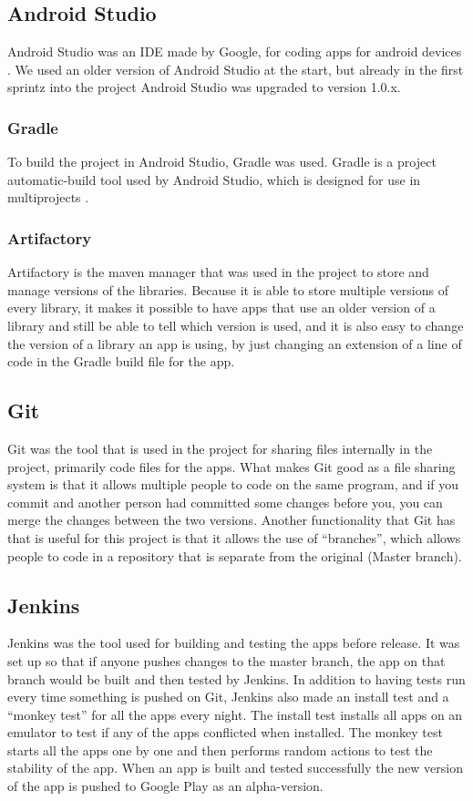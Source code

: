 \subsection{Android Studio}
 Android Studio was an IDE made by Google, for coding apps for android devices \citep{AndroidStudio}. We used an older version of Android Studio at the start, but already in the first sprintz into the project Android Studio was upgraded to version 1.0.x.

\subsubsection{Gradle}
To build the project in Android Studio, Gradle was used. Gradle is a project automatic-build tool used by Android Studio, which is designed for use in multiprojects \citep{Gradle}.

\subsubsection{Artifactory}
Artifactory is the maven manager that was used in the project to store and manage versions of the libraries. Because it is able to store multiple versions of every library, it makes it possible to have apps that use an older version of a library and still be able to tell which version is used, and it is also easy to change the version of a library an app is using, by just changing an extension of a line of code in the Gradle build file for the app.

\subsection{Git}
Git was the tool that is used in the project for sharing files internally in the project, primarily code files for the apps. What makes Git good as a file sharing system is that it allows multiple people to code on the same program, and if you commit and another person had committed some changes before you, you can merge the changes between the two versions. Another functionality that Git has that is useful for this project is that it allows the use of “branches”, which allows people to code in a repository that is separate from the original (Master branch).

\subsection{Jenkins}
Jenkins was the tool used for building and testing the apps before release. It was set up so that if anyone pushes changes to the master branch, the app on that branch would be built and then tested by Jenkins. In addition to having tests run every time something is pushed on Git, Jenkins also made an install test and a “monkey test” for all the apps every night. The install test installs all apps on an emulator to test if any of the apps conflicted when installed. The monkey test starts all the apps one by one and then performs random actions to test the stability of the app. When an app is built and tested successfully the new version of the app is pushed to Google Play as an alpha-version.

